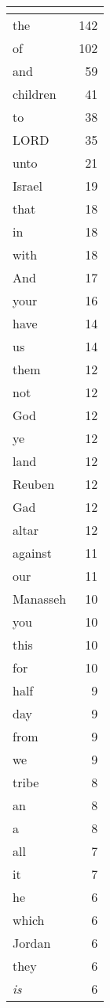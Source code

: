 \begin{center}
\begin{longtable}{l|r}
\hline \multicolumn{2}{c}{{ }} \\ \hline
\endfoot 
the & 142\\ \hline 
of & 102\\ \hline 
and & 59\\ \hline 
children & 41\\ \hline 
to & 38\\ \hline 
LORD & 35\\ \hline 
unto & 21\\ \hline 
Israel & 19\\ \hline 
that & 18\\ \hline 
in & 18\\ \hline 
with & 18\\ \hline 
And & 17\\ \hline 
your & 16\\ \hline 
have & 14\\ \hline 
us & 14\\ \hline 
them & 12\\ \hline 
not & 12\\ \hline 
God & 12\\ \hline 
ye & 12\\ \hline 
land & 12\\ \hline 
Reuben & 12\\ \hline 
Gad & 12\\ \hline 
altar & 12\\ \hline 
against & 11\\ \hline 
our & 11\\ \hline 
Manasseh & 10\\ \hline 
you & 10\\ \hline 
this & 10\\ \hline 
for & 10\\ \hline 
half & 9\\ \hline 
day & 9\\ \hline 
from & 9\\ \hline 
we & 9\\ \hline 
tribe & 8\\ \hline 
an & 8\\ \hline 
a & 8\\ \hline 
all & 7\\ \hline 
it & 7\\ \hline 
he & 6\\ \hline 
which & 6\\ \hline 
Jordan & 6\\ \hline 
they & 6\\ \hline 
\emph{is} & 6\\ \hline 

\end{longtable}
\end{center}
